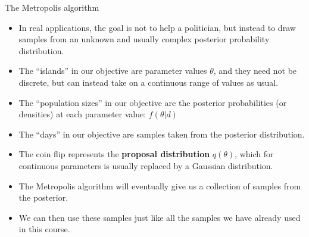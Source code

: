 \documentclass[handout]{beamer}
\begin{document}
\begin{frame}{The Metropolis algorithm}
\scriptsize{

\begin{itemize}
\item In real applications, the goal is not to help a politician, but instead to draw samples from an unknown and usually complex posterior probability distribution.
\item The ``islands'' in our objective are parameter values $\theta$, and they need not be discrete, but can instead take on a continuous range of values as usual.
\item The ``population sizes'' in our objective are the posterior probabilities (or densities) at each parameter value: $f(\theta|d)$
\item The ``days'' in our objective are samples taken from the posterior distribution.

\item  The coin flip represents the \textbf{proposal distribution} $q(\theta)$, which for continuous parameters is usually replaced by a Gaussian distribution.


\item The Metropolis algorithm will eventually give us a collection of samples from the posterior. 

\item We can then use these samples just like all the samples we have already used in this course.

\end{itemize}


} 
\end{frame}
\end{document}
